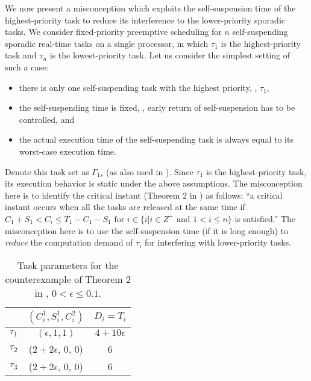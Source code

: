 We now present a misconception which exploits the  self-suspension time  of the highest-priority task to reduce its interference to the lower-priority sporadic tasks. 
We consider fixed-priority preemptive scheduling for $n$ self-suspending sporadic real-time tasks on a single processor, in which $\tau_1$ is the highest-priority task and $\tau_n$ is the lowest-priority task.
Let us consider the simplest setting of such a case:
\begin{itemize}
\item there is only one self-suspending task with the highest priority, \ie, $\tau_1$,
\item the self-suspending time is fixed, \ie, early return of self-suspension has to be controlled, and
\item the actual execution time of the self-suspending task is always equal to its worst-case execution time.
\end{itemize}
Denote this task set as $\Gamma_{1s}$ (as also used in \cite{RTSS-KimANR13}).  Since $\tau_1$ is the highest-priority task, its execution behavior is static under the above assumptions. The misconception here is to identify the critical instant  (Theorem 2 in \cite{RTSS-KimANR13}) as follows: ``a critical instant occurs when all the tasks are released at the same time if $C_1 +S_1 < C_i  \leq T_1-C_1-S_1 \mbox{ for } i \in\{i|i\in Z^{+} \mbox{ and } 1<i\leq n\}$ is satisfied.'' The misconception here is to use the self-suspension time (if it is long enough) to \emph{reduce} the computation demand of $\tau_i$ for interfering with lower-priority tasks. 


\begin{table} [t]
\centering
    \begin{tabular}{|c|c|c|}
 \hline
        & $(C_i^1, S_i^1, C_i^2)$ &  $D_i=T_i$\\ 
        \hline
        $\tau_1$ & $(\epsilon, 1, 1)$ &  $4+10\epsilon$\\ 
        $\tau_2$ &  ($2+2\epsilon$, 0, 0) & 6  \\ 
        $\tau_3$ & ($2+2\epsilon$, 0, 0) & 6  \\
        \hline
    \end{tabular} 
    \caption{Task parameters for the counterexample of Theorem 2 in \cite{RTSS-KimANR13}, $0 < \epsilon \leq 0.1$.}
    \label{table:ex-highest-priority}
\end{table}


